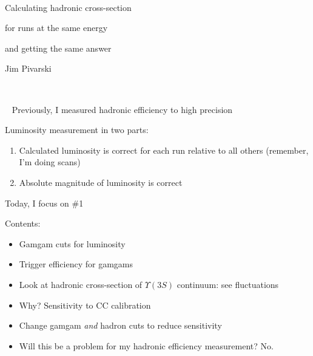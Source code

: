 \documentclass[landscape]{article}
\newenvironment{slide}{\mbox{ }\vfill}{\vfill \mbox{ } \pagebreak}
\begin{document}
\huge
\renewcommand{\labelitemi}{-}
\setlength{\parindent}{0 cm}

\begin{slide}
  \vfill
  \begin{center}
    {\Huge Calculating hadronic cross-section}

    \vspace{0.5 cm}
    {\Huge for runs at the same energy}

    \vspace{0.5 cm}
    {\Huge and getting the same answer}

    \vfill Jim Pivarski
  \end{center}
  \vfill
\end{slide}

\begin{slide}
  Previously, I measured hadronic efficiency to high precision

  \vfill
  Luminosity measurement in two parts:
  \begin{enumerate}
    \item Calculated luminosity is correct for each run relative to all
    others (remember, I'm doing scans)

    \item Absolute magnitude of luminosity is correct
  \end{enumerate}

  \vfill
  Today, I focus on \#1

  \vfill
  Contents:
  \begin{itemize}
    \item Gamgam cuts for luminosity

    \item Trigger efficiency for gamgams

    \item Look at hadronic cross-section of $\Upsilon(3S)$ continuum:
    see fluctuations

    \item Why?  Sensitivity to CC calibration

    \item Change gamgam {\it and} hadron cuts to reduce sensitivity

    \item Will this be a problem for my hadronic efficiency measurement?  No.
  \end{itemize}
\end{slide}
\end{document}
